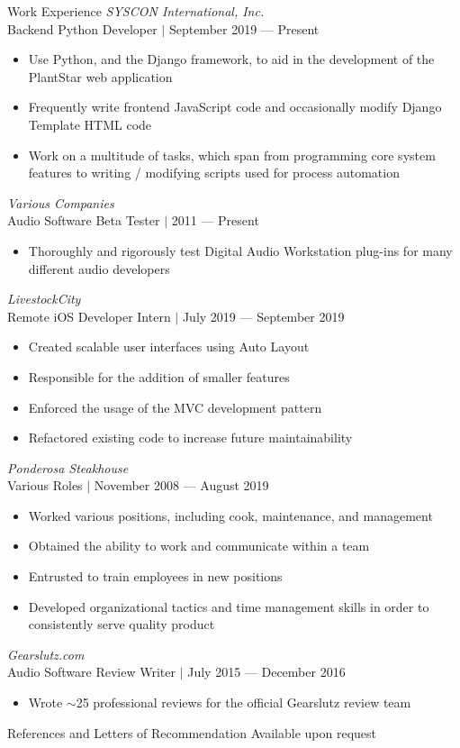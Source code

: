 \documentclass{Joseph_T_Lyons_Resume}
\newenvironment{tightlySpacedList}
{ \begin{itemize}
    \setlength{\itemsep}{0pt}
    \setlength{\parskip}{0pt}
    \setlength{\parsep}{0pt}     }
{ \end{itemize}                  }
\begin{document}
\begin{rSection}{Work Experience}
\textit{SYSCON International, Inc.}
\\Backend Python Developer $\mid$ September 2019 --- Present
\begin{tightlySpacedList}
    \item Use Python, and the Django framework, to aid in the development of the
     PlantStar web application
    \item Frequently write frontend JavaScript code and occasionally modify
     Django Template HTML code
    \item Work on a multitude of tasks, which span from programming core system
     features to writing / modifying scripts used for process automation
\end{tightlySpacedList}

\textit{Various Companies}
\\Audio Software Beta Tester $\mid$ 2011 --- Present
\begin{tightlySpacedList}
    \item Thoroughly and rigorously test Digital Audio Workstation plug-ins for
     many different audio developers
\end{tightlySpacedList}

\textit{LivestockCity}
\\Remote iOS Developer Intern $\mid$ July 2019 --- September 2019
\begin{tightlySpacedList}
    \item Created scalable user interfaces using Auto Layout
    \item Responsible for the addition of smaller features
    \item Enforced the usage of the MVC development pattern
    \item Refactored existing code to increase future maintainability
\end{tightlySpacedList}

\textit{Ponderosa Steakhouse}
\\Various Roles $\mid$ November 2008 --- August 2019
\begin{tightlySpacedList}
    \item Worked various positions, including cook, maintenance, and management
    \item Obtained the ability to work and communicate within a team
    \item Entrusted to train employees in new positions
    \item Developed organizational tactics and time management skills in order
     to consistently serve quality product
\end{tightlySpacedList}

\textit{Gearslutz.com}
\\Audio Software Review Writer $\mid$ July 2015 --- December 2016
\begin{tightlySpacedList}
    \item Wrote $\sim$25 professional reviews for the official Gearslutz review
     team
\end{tightlySpacedList}
\end{rSection}

\begin{rSection}{References and Letters of Recommendation}
Available upon request
\end{rSection}
\end{document}
